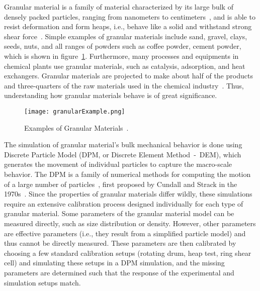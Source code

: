 Granular material is a family of material characterized by its large bulk of densely packed particles, ranging from nanometers to centimeters~\cite{introGranular2}, and is able to resist deformation and form heaps, i.e., behave like a solid and withstand strong shear force~\cite{introGranular3}. Simple examples of granular materials include sand, gravel, clays, seeds, nuts, and all ranges of powders such as coffee powder, cement powder, which is shown in figure~\ref{fig:granularExample}. Furthermore, many processes and equipments in chemical plants use granular materials, such as catalysis, adsorption, and heat exchangers. Granular materials are projected to make about half of the products and three-quarters of the raw materials used in the chemical industry~\cite{introGranular}. Thus, understanding how granular materials behave is of great significance. 

\begin{figure}[H]
    \centering
    \texttt{[image: granularExample.png]}
    \caption{Examples of Granular Materials~\cite{granularExample}.}
    \label{fig:granularExample}
\end{figure}

The simulation of granular material's bulk mechanical behavior is done using Discrete Particle Model (DPM, or Discrete Element Method~-~DEM), which generates the movement of individual particles to capture the macro-scale behavior. The DPM is a family of numerical methods for computing the motion of a large number of particles~\cite{Weng:2015}, first proposed by Cundall and Strack in the 1970s~\cite{cundallstrack}.
Since the properties of granular materials differ wildly, these simulations require an extensive calibration process designed individually for each type of granular material. Some parameters of the granular material model can be measured directly, such as size distribution or density. However, other parameters are effective parameters (i.e., they result from a simplified particle model) and thus cannot be directly measured. These parameters are then calibrated by choosing a few standard calibration setups (rotating drum, heap test, ring shear cell) and simulating these setups in a DPM simulation, and the missing parameters are determined such that the response of the experimental and simulation setups match.

